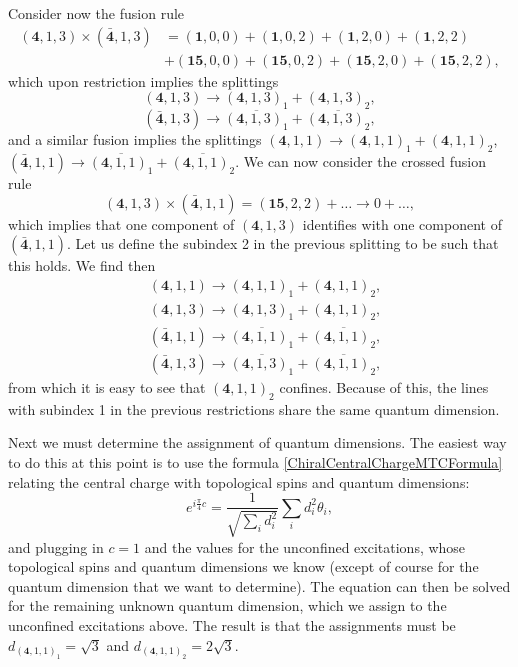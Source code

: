\documentclass[11pt]{article}
\numberwithin{equation}{section}
\begin{document}
Consider now the fusion rule
\begin{align} \label{413fusionbar413}
    (\mathbf{4},1,3) \times (\mathbf{\bar{4}},1,3) & = (\mathbf{1},0,0) + (\mathbf{1},0,2) + (\mathbf{1},2,0) + (\mathbf{1},2,2) \\[0.3cm] 
    &+ (\mathbf{15},0,0) + (\mathbf{15},0,2) + (\mathbf{15},2,0) + (\mathbf{15},2,2), \nonumber
\end{align}
which upon restriction implies the splittings
\begin{equation}
    (\mathbf{4},1,3) \longrightarrow (\mathbf{4},1,3)_{1} + (\mathbf{4},1,3)_{2},
\end{equation}
\begin{equation}
    (\mathbf{\bar{4}},1,3) \longrightarrow \overline{(\mathbf{4},1,3)_{1}} + \overline{(\mathbf{4},1,3)_{2}},
\end{equation}
and a similar fusion implies the splittings $(\mathbf{4},1,1) \to(\mathbf{4},1,1)_{1} + (\mathbf{4},1,1)_{2}$, $(\mathbf{\bar{4}},1,1) \to \overline{(\mathbf{4},1,1)_{1}} + \overline{(\mathbf{4},1,1)_{2}}$. We can now consider the crossed fusion rule
\begin{equation}
    (\mathbf{4},1,3) \times (\mathbf{\bar{4}},1,1) = (\mathbf{15},2,2) + \ldots \longrightarrow 0+\ldots,
\end{equation}
which implies that one component of $(\mathbf{4},1,3)$ identifies with one component of $(\mathbf{\bar{4}},1,1)$. Let us define the subindex 2 in the previous splitting to be such that this holds. We find then
\begin{align}
    &(\mathbf{4},1,1) \longrightarrow (\mathbf{4},1,1)_{1} + (\mathbf{4},1,1)_{2}, \\[0.3cm]
    &(\mathbf{4},1,3) \longrightarrow (\mathbf{4},1,3)_{1} + (\mathbf{4},1,1)_{2}, \\[0.3cm]
    &(\mathbf{\bar{4}},1,1) \longrightarrow \overline{(\mathbf{4},1,1)_{1}} + \overline{(\mathbf{4},1,1)_{2}}, \\[0.3cm]
    &(\mathbf{\bar{4}},1,3) \longrightarrow \overline{(\mathbf{4},1,3)_{1}} + \overline{(\mathbf{4},1,1)_{2}} ,
\end{align}
from which it is easy to see that $(\mathbf{4},1,1)_{2}$ confines. Because of this, the lines with subindex 1 in the previous restrictions share the same quantum dimension.

Next we must determine the assignment of quantum dimensions. The easiest way to do this at this point is to use the formula \eqref{ChiralCentralChargeMTCFormula} relating the central charge with topological spins and quantum dimensions:
\begin{equation}
    e^{i\frac{\pi}{4}c} = \frac{1}{\sqrt{\sum_{i}d_{i}^{2}}}\sum_{i}d^{2}_{i}\theta_{i},
\end{equation}
and plugging in $c=1$ and the values for the unconfined excitations, whose topological spins and quantum dimensions we know (except of course for the quantum dimension that we want to determine). The equation can then be solved for the remaining unknown quantum dimension, which we assign to the unconfined excitations above. The result is that the assignments must be $d_{(\mathbf{4},1,1)_{1}} = \sqrt{3}$ and $d_{(\mathbf{4},1,1)_{2}} = 2\sqrt{3}$.
\end{document}
